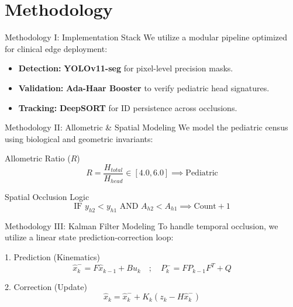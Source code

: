 \section{Methodology}

\begin{frame}{Methodology I: Implementation Stack}
    We utilize a modular pipeline optimized for clinical edge deployment:
    \begin{itemize}
        \item \textbf{Detection:} \textbf{YOLOv11-seg} for pixel-level precision masks.
        \item \textbf{Validation:} \textbf{Ada-Haar Booster} to verify pediatric head signatures.
        \item \textbf{Tracking:} \textbf{DeepSORT} for ID persistence across occlusions.
    \end{itemize}
\end{frame}

\begin{frame}{Methodology II: Allometric \& Spatial Modeling}
    We model the pediatric census using biological and geometric invariants:
    \begin{block}{Allometric Ratio ($R$)}
        \begin{equation}
            R = \frac{H_{total}}{H_{head}} \in [4.0, 6.0] \implies \text{Pediatric}
        \end{equation}
    \end{block}
    \begin{block}{Spatial Occlusion Logic}
        \begin{equation}
            \text{IF } y_{h2} < y_{h1} \text{ AND } A_{h2} < A_{h1} \implies \text{Count} + 1
        \end{equation}
    \end{block}
\end{frame}

\begin{frame}{Methodology III: Kalman Filter Modeling}
    To handle temporal occlusion, we utilize a linear state prediction-correction loop:
    \begin{block}{1. Prediction (Kinematics)}
        \begin{equation}
            \hat{x}_k^- = F\hat{x}_{k-1} + Bu_k \quad ; \quad P_k^- = FP_{k-1}F^T + Q
        \end{equation}
    \end{block}
    \begin{block}{2. Correction (Update)}
        \begin{equation}
            \hat{x}_k = \hat{x}_k^- + K_k(z_k - H\hat{x}_k^-)
        \end{equation}
    \end{block}
\end{frame}
